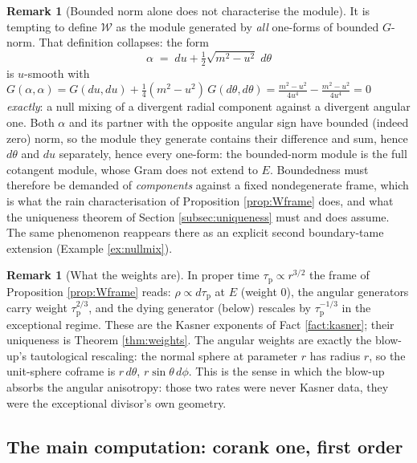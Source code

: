 \documentclass[11pt]{article}
\theoremstyle{definition}
\newtheorem{remark}[theorem]{Remark}
\newcommand{\shW}{\mathcal{W}}
\begin{document}
\begin{remark}[Bounded norm alone does not characterise the module]\label{rem:nullmixing}
It is tempting to define $\shW$ as the module generated by \emph{all} one-forms of bounded $G$-norm. That definition collapses: the form
\[
\alpha \;=\; du + \tfrac12\sqrt{m^2 - u^2}\; d\theta
\]
is $u$-smooth with $G(\alpha, \alpha) = G(du,du) + \tfrac14 (m^2 - u^2)\, G(d\theta,d\theta) = \frac{m^2 - u^2}{4u^4} - \frac{m^2-u^2}{4u^4} = 0$ \emph{exactly}: a null mixing of a divergent radial component against a divergent angular one. Both $\alpha$ and its partner with the opposite angular sign have bounded (indeed zero) norm, so the module they generate contains their difference and sum, hence $d\theta$ and $du$ separately, hence every one-form: the bounded-norm module is the full cotangent module, whose Gram does not extend to $E$. Boundedness must therefore be demanded of \emph{components} against a fixed nondegenerate frame, which is what the rain characterisation of Proposition \ref{prop:Wframe} does, and what the uniqueness theorem of Section \ref{subsec:uniqueness} must and does assume. The same phenomenon reappears there as an explicit second boundary-tame extension (Example \ref{ex:nullmix}).
\end{remark}

\begin{remark}[What the weights are]\label{rem:schwweights}
In proper time $\tau_{\mathrm{p}} \propto r^{3/2}$ the frame of Proposition \ref{prop:Wframe} reads: $\rho \propto d\tau_{\mathrm{p}}$ at $E$ (weight $0$), the angular generators carry weight $\tau_{\mathrm{p}}^{2/3}$, and the dying generator (below) rescales by $\tau_{\mathrm{p}}^{-1/3}$ in the exceptional regime. These are the Kasner exponents of Fact \ref{fact:kasner}; their uniqueness is Theorem \ref{thm:weights}. The angular weights are exactly the blow-up's tautological rescaling: the normal sphere at parameter $r$ has radius $r$, so the unit-sphere coframe is $r\,d\theta$, $r\sin\theta\,d\phi$. This is the sense in which the blow-up absorbs the angular anisotropy: those two rates were never Kasner data, they were the exceptional divisor's own geometry.
\end{remark}

\subsection{The main computation: corank one, first order}\label{subsec:schwmain}
\end{document}
